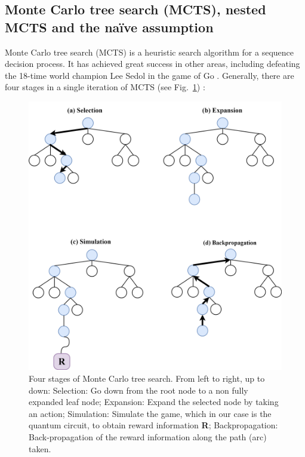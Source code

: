 \documentclass[a4paper,onecolumn,11pt]{quantumarticle}
\begin{document}

\subsection{Monte Carlo tree search (MCTS), nested MCTS and the na\"ive assumption}
Monte Carlo tree search (MCTS) is a heuristic search algorithm for a sequence decision process. It has achieved great success in other areas, including defeating the 18-time world champion Lee Sedol in the game of Go \cite{AlphaGoDBLP:journals/nature/SilverHMGSDSAPL16, AlphaGoZeroDBLP:journals/nature/SilverSSAHGHBLB17}. Generally, there are four stages in a single iteration of MCTS (see Fig.~\ref{fig:mcts}) \cite{MCTS_for_game10.5555/3022539.3022579}:
\begin{figure}[]
  \centering
  \includegraphics[width=0.8\linewidth]{Figures/mcts.png}
  \caption{Four stages of Monte Carlo tree search. From left to right, up to down: Selection: Go down from the root node to a non fully expanded leaf node; Expansion: Expand the selected node by taking an action; Simulation: Simulate the game, which in our case is the quantum circuit, to obtain reward information \textbf{R}; Backpropagation: Back-propagation of the reward information along the path (arc) taken.}
  \label{fig:mcts}
\end{figure}
\end{document}
